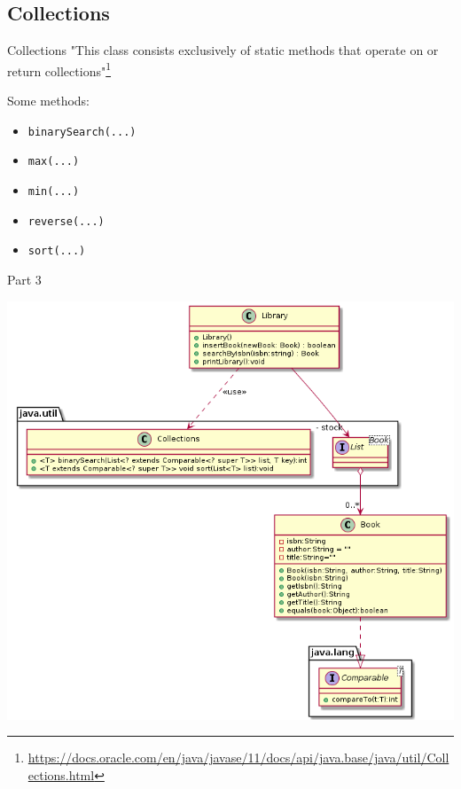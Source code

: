 \subsection{Collections}
\begin{frame}{Collections}
	"This class consists exclusively of static methods that operate on or return collections"\footnote{\url{https://docs.oracle.com/en/java/javase/11/docs/api/java.base/java/util/Collections.html}}

	Some methods:
	\begin{itemize}
		\item \texttt{binarySearch(...)}
		\item \texttt{max(...)}
		\item \texttt{min(...)}
		\item \texttt{reverse(...)}
		\item \texttt{sort(...)}
	\end{itemize}
\end{frame}
\begin{frame}{Part 3}

	\begin{center}
		\includegraphics[scale=.34]{07_collection/hands_on_03.png}
	\end{center}

\end{frame}

